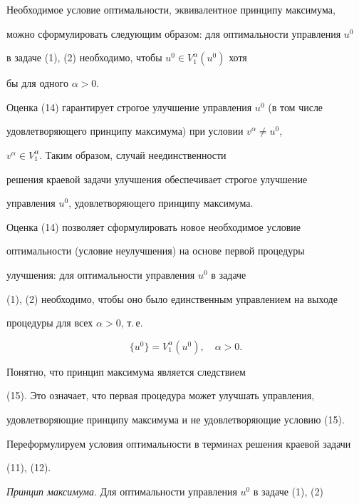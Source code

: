 Необходимое условие оптимальности, эквивалентное принципу максимума,


можно сформулировать следующим образом: для оптимальности управления $u^0$


в задаче (1), (2) необходимо, чтобы $u^0\in{V}_1^{\alpha}(u^0)$ хотя


бы для одного $\alpha>0$.





Оценка (14) гарантирует строгое улучшение управления $u^0$ (в том числе


удовлетворяющего принципу максимума) при условии $v^{\alpha}\neq{u^0}$,


$v^{\alpha}\in{V}_{1}^{\alpha}$. Таким образом, случай неединственности


решения краевой задачи улучшения обеспечивает строгое улучшение


управления $u^0$, удовлетворяющего принципу максимума.





Оценка (14) позволяет сформулировать новое необходимое условие


оптимальности (условие неулучшения) на основе первой процедуры


улучшения: для оптимальности управления $u^0$ в задаче


(1), (2) необходимо, чтобы оно было единственным управлением на выходе


процедуры для всех $\alpha>0$, т.\,е.


\begin{equation}


\{u^0\}=V_{1}^{\alpha}(u^0),\quad\alpha>0.


\end{equation}


Понятно, что принцип максимума является следствием 


(15). Это означает, что первая процедура может улучшать управления,


удовлетворяющие принципу максимума и не удовлетворяющие условию (15).





Переформулируем условия оптимальности в терминах решения краевой задачи


(11), (12).





{\it Принцип максимума}. Для оптимальности управления $u^0$ в задаче (1), (2)



